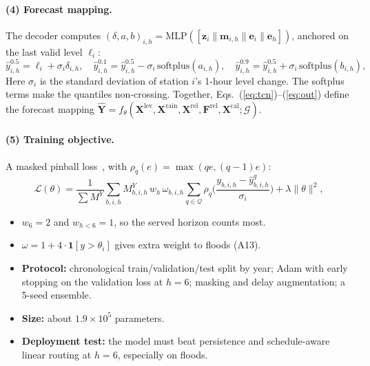 \documentclass[11pt,a4paper]{article}
\begin{document}
\paragraph{(4) Forecast mapping.} The decoder computes
$(\delta,a,b)_{i,h}=\mathrm{MLP}([\mathbf{z}_i\|\mathbf{m}_{i,h}\|\mathbf{e}_i\|\mathbf{e}_h])$,
anchored on the last valid level $\ell_i$:
\begin{equation}
  \hat y^{0.5}_{i,h}=\ell_i+\sigma_i\delta_{i,h},\quad
  \hat y^{0.1}_{i,h}=\hat y^{0.5}_{i,h}-\sigma_i\,\mathrm{softplus}(a_{i,h}),\quad
  \hat y^{0.9}_{i,h}=\hat y^{0.5}_{i,h}+\sigma_i\,\mathrm{softplus}(b_{i,h}),
  \label{eq:out}
\end{equation}
Here $\sigma_i$ is the standard deviation of station $i$'s 1-hour level change.
The softplus terms make the quantiles non-crossing. Together,
Eqs.~(\ref{eq:tcn})--(\ref{eq:out}) define the forecast mapping
$\hat{\mathbf{Y}}=f_\theta(\mathbf{X}^{\mathrm{lev}},\mathbf{X}^{\mathrm{rain}},\mathbf{X}^{\mathrm{rel}},\mathbf{F}^{\mathrm{rel}},\mathbf{X}^{\mathrm{cal}};\mathcal{G})$.

\paragraph{(5) Training objective.} A masked pinball loss~\cite{koenker}, with
$\rho_q(e)=\max(qe,(q-1)e)$:
\begin{equation}
  \mathcal{L}(\theta)=\frac{1}{\sum M^{Y}}\sum_{b,i,h}M^{Y}_{b,i,h}\,w_h\,\omega_{b,i,h}
  \sum_{q\in\mathcal{Q}}\rho_q\Big(\frac{y_{b,i,h}-\hat y^{q}_{b,i,h}}{\sigma_i}\Big)+\lambda\|\theta\|^2,
  \label{eq:loss}
\end{equation}
\begin{itemize}
  \item $w_6=2$ and $w_{h<6}=1$, so the served horizon counts most.
  \item $\omega=1+4\cdot\mathbf{1}[y>\theta_i]$ gives extra weight to floods
        (A13).
  \item \textbf{Protocol:} chronological train/validation/test split by year;
        Adam with early stopping on the validation loss at $h=6$; masking and
        delay augmentation; a 5-seed ensemble.
  \item \textbf{Size:} about $1.9\times10^5$ parameters.
  \item \textbf{Deployment test:} the model must beat persistence and
        schedule-aware linear routing at $h=6$, especially on floods.
\end{itemize}
\end{document}
